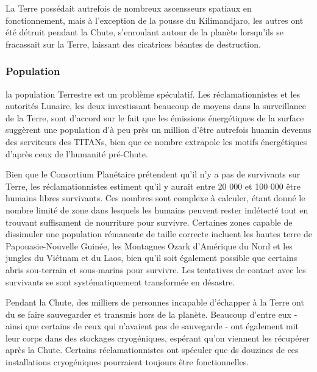                                                          La Terre possédait autrefois de nombreux ascensseurs spatiaux en fonctionnement, mais à l'exception de la pousse du Kilimandjaro, les autres ont été détruit pendant la Chute, s'enroulant autour de la planète lorsqu'ils se fracassait sur la Terre, laissant des cicatrices béantes de destruction. 

                                                         \subsubsection{Population} \label{sec:population} 

                                                         la population Terrestre est un problème spéculatif. Les réclamationnistes et les autorités Lunaire, les deux investissant beaucoup de moyens dans la surveillance de la Terre, sont d'accord sur le fait que les émissions énergétiques de la surface suggèrent une population d'à peu près un million d'être autrefois huamin devenus des serviteurs des TITANs, bien que ce nombre extrapole les motifs énergétiques d'après ceux de l'humanité pré-Chute. 

                                                         Bien que le Consortium Planétaire prétendent qu'il n'y a pas de survivants sur Terre, les réclamationnistes estiment qu'il y aurait entre 20 000 et 100 000 être humains libres survivants. Ces nombres sont complexe à calculer, étant donné le nombre limité de zone dans lesquels les humains peuvent rester indétecté tout en trouvant suffisament de nourriture pour survivre. Certaines zones capable de dissimuler une population rémanente de taille correcte incluent les hautes terre de Papouasie-Nouvelle Guinée, les Montagnes Ozark d'Amérique du Nord et les jungles du Viétnam et du Laos, bien qu'il soit également possible que certains abris sou-terrain et sous-marins pour survivre. Les tentatives de contact avec les survivants se sont systématiquement transformée en désastre. 

                                                         Pendant la Chute, des milliers de personnes incapable d'échapper à la Terre ont du se faire sauvegarder et transmis hors de la planète. Beaucoup d'entre eux - ainsi que certains de ceux qui n'avaient pas de sauvegarde - ont également mit leur corps dans des stockages cryogéniques, espérant qu'on viennent les récupérer après la Chute. Certains réclamationnistes ont spéculer que ds douzines de ces installations cryogéniques pourraient toujours être fonctionnelles. 

